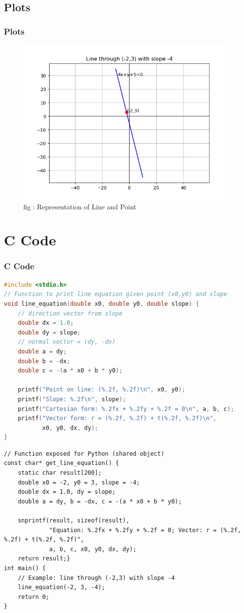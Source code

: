 \documentclass{beamer}
\theoremstyle{remark}
\numberwithin{equation}{section}
\begin{document}
\subsection{Plots}
\begin{frame}
\frametitle{Plots}
\begin{figure}
\centering
\includegraphics[width=0.9\columnwidth]{figs/fig6.png}
\caption{fig : Representation of Line and Point}
\label{Fig6}
\end{figure}
\end{frame}
\section{C Code}
\begin{frame}[fragile]
\frametitle{C Code }
\begin{lstlisting}[language=C]
#include <stdio.h>
// Function to print line equation given point (x0,y0) and slope
void line_equation(double x0, double y0, double slope) {
    // direction vector from slope
    double dx = 1.0;
    double dy = slope;
    // normal vector = (dy, -dx)
    double a = dy;
    double b = -dx;
    double c = -(a * x0 + b * y0);

    printf("Point on line: (%.2f, %.2f)\n", x0, y0);
    printf("Slope: %.2f\n", slope);
    printf("Cartesian form: %.2fx + %.2fy + %.2f = 0\n", a, b, c);
    printf("Vector form: r = (%.2f, %.2f) + t(%.2f, %.2f)\n",
           x0, y0, dx, dy);
}
\end{lstlisting}
\end{frame}
\begin{frame}[fragile]
\begin{lstlisting}
// Function exposed for Python (shared object)
const char* get_line_equation() {
    static char result[200];
    double x0 = -2, y0 = 3, slope = -4;
    double dx = 1.0, dy = slope;
    double a = dy, b = -dx, c = -(a * x0 + b * y0);

    snprintf(result, sizeof(result),
             "Equation: %.2fx + %.2fy + %.2f = 0; Vector: r = (%.2f, %.2f) + t(%.2f, %.2f)",
             a, b, c, x0, y0, dx, dy);
    return result;}
int main() {
    // Example: line through (-2,3) with slope -4
    line_equation(-2, 3, -4);
    return 0;
}  
\end{lstlisting}
\end{frame}
\end{document}
